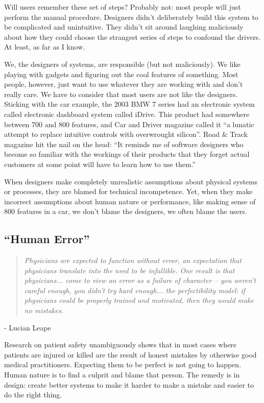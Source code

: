 Will users remember these set of steps? Probably not: most people will just perform the manual procedure. Designers didn't deliberately build this system to be complicated and unintuitive. They didn't sit around laughing maliciously about how they could choose the strangest series of steps to confound the drivers. At least, as far as I know.

We, the designers of systems, are responsible (but not maliciously). We like playing with gadgets and figuring out the cool features of something. Most people, however, just want to use whatever they are working with and don't really care. We have to consider that most users are not like the designers. Sticking with the car example, the 2003 BMW 7 series had an electronic system called electronic dashboard system called iDrive. This product had somewhere between 700 and 800 features, and Car and Driver magazine called it ``a lunatic attempt to replace intuitive controls with overwrought silicon''. Road \& Track magazine hit the nail on the head: ``It reminds me of software designers who become so familiar with the workings of their products that they forget actual customers at some point will have to learn how to use them.''

When designers make completely unrealistic assumptions about physical systems or processes, they are blamed for technical incompetence. Yet, when they make incorrect assumptions about human nature or performance, like making sense of 800 features in a car, we don't blame the designers, we often blame the users.




\subsection*{``Human Error''}
\begin{quote}
\textit{Physicians are expected to function without error, an expectation that physicians translate into the need to be infallible. One result is that physicians... come to view an error as a failure of character -- you weren't careful enough, you didn't try hard enough... the perfectibility model: if physicians could be properly trained and motivated, then they would make no mistakes.}
\end{quote}
\hfill - Lucian Leape

Research on patient safety unambiguously shows that in most cases where patients are injured or killed are the result of honest mistakes by otherwise good medical practitioners. Expecting them to be perfect is not going to happen. Human nature is to find a culprit and blame that person. The remedy is in design: create better systems to make it harder to make a mistake and easier to do the right thing.

